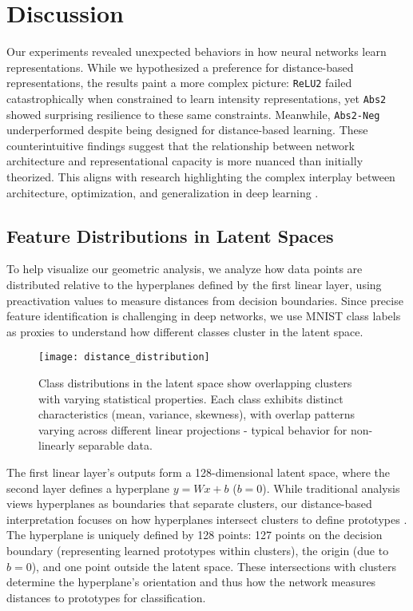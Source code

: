 \section{Discussion}
\label{sec:discussion}

Our experiments revealed unexpected behaviors in how neural networks learn representations. While we hypothesized a preference for distance-based representations, the results paint a more complex picture: \texttt{ReLU2} failed catastrophically when constrained to learn intensity representations, yet \texttt{Abs2} showed surprising resilience to these same constraints. Meanwhile, \texttt{Abs2-Neg} underperformed despite being designed for distance-based learning. These counterintuitive findings suggest that the relationship between network architecture and representational capacity is more nuanced than initially theorized. This aligns with research highlighting the complex interplay between architecture, optimization, and generalization in deep learning \cite{bengio2013representation, jacot2018neural, lee2019wide}.

\subsection{Feature Distributions in Latent Spaces}

To help visualize our geometric analysis, we analyze how data points are distributed relative to the hyperplanes defined by the first linear layer, using preactivation values to measure distances from decision boundaries. Since precise feature identification is challenging in deep networks, we use MNIST class labels as proxies to understand how different classes cluster in the latent space.

\begin{figure}[H]
    \centering
    \texttt{[image: distance\_distribution]}
    \caption{Class distributions in the latent space show overlapping clusters with varying statistical properties. Each class exhibits distinct characteristics (mean, variance, skewness), with overlap patterns varying across different linear projections - typical behavior for non-linearly separable data.}
    \label{fig:distance_distribution_label}
\end{figure}

The first linear layer's outputs form a 128-dimensional latent space, where the second layer defines a hyperplane $y=Wx+b$ ($b=0$). While traditional analysis views hyperplanes as boundaries that separate clusters, our distance-based interpretation focuses on how hyperplanes intersect clusters to define prototypes \cite{snell2017prototypical, weinberger2009distance}. The hyperplane is uniquely defined by 128 points: 127 points on the decision boundary (representing learned prototypes within clusters), the origin (due to $b=0$), and one point outside the latent space. These intersections with clusters determine the hyperplane's orientation and thus how the network measures distances to prototypes for classification.

